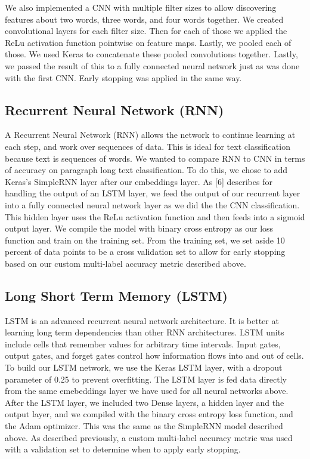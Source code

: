 \documentclass[sigconf]{acmart}
\begin{document}
We also implemented a CNN with multiple filter sizes to allow discovering features about two words, three words, and four words together. We created convolutional layers for each filter size.  Then for each of those we applied the ReLu activation function pointwise on feature maps.  Lastly, we pooled each of those. We used Keras to concatenate these pooled convolutions together.  Lastly, we passed the result of this to a fully connected neural network just as was done with the first CNN. Early stopping was applied in the same way.

\subsection{Recurrent Neural Network (RNN)}
A Recurrent Neural Network (RNN) allows the network to continue learning at each step, and work over sequences of data. This is ideal for text classification because text is sequences of words. We wanted to compare RNN to CNN in terms of accuracy on paragraph long text classification.  To do this, we chose to add Keras's SimpleRNN layer after our embeddings layer. As [6] describes for handling the output of an LSTM layer, we feed the output of our recurrent layer into a fully connected neural network layer as we did the the CNN classification. This hidden layer uses the ReLu activation function and then feeds into a sigmoid output layer. We compile the model with binary cross entropy as our loss function and train on the training set.  From the training set, we set aside 10 percent of data points to be a cross validation set to allow for early stopping based on our custom multi-label accuracy metric described above. 

\subsection{Long Short Term Memory (LSTM)}
LSTM is an advanced recurrent neural network architecture.  It is better at learning long term dependencies than other RNN architectures.  LSTM units include cells that remember values for arbitrary time intervals. Input gates, output gates, and forget gates control how information flows into and out of cells. To build our LSTM network, we use the Keras LSTM layer, with a dropout parameter of 0.25 to prevent overfitting. The LSTM layer is fed data directly from the same emebeddings layer we have used for all neural networks above. After the LSTM layer, we included two Dense layers, a hidden layer and the output layer, and we compiled with the binary cross entropy loss function, and the Adam optimizer. This was the same as the SimpleRNN model described above. As described previously, a custom multi-label accuracy metric was used with a validation set to determine when to apply early stopping. 
\end{document}
